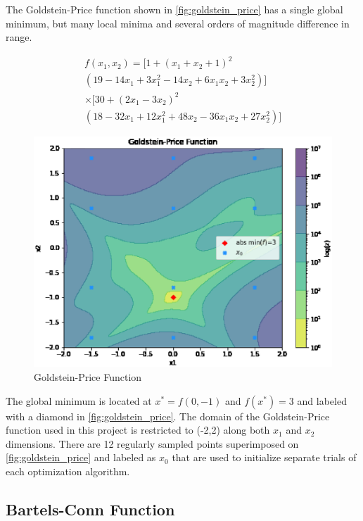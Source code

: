 \documentclass{vgtc}                          %
\begin{document}
The Goldstein-Price function \cite{Goldstein:1971} shown in \autoref{fig:goldstein_price} has a single global minimum, but many local minima and several orders of magnitude difference in range.

\begin{equation}
\begin{split}
f(x_1, x_2) = [1 + (x_1 + x_2 + 1)^2 \\
(19 - 14 x_1 + 3 x_1^2 - 14 x_2 + 6 x_1 x_2 + 3 x_2^2)] \\
\times [30 + (2 x_1 - 3 x_2)^2 \\
(18 - 32 x_1 + 12 x_1^2 + 48 x_2 - 36 x_1 x_2 + 27 x_2^2)]
\end{split}
\end{equation}

\begin{figure}[tb]
\centering
\includegraphics[width=\columnwidth]{figures/pictures/images/goldstein_price-plot2d.eps}
\caption{Goldstein-Price Function}
\label{fig:goldstein_price}
\end{figure}

 The global minimum is located at $x^* = f(0, -1)$ and $f(x^*) = 3$ and labeled with a diamond in \autoref{fig:goldstein_price}.  The domain of the Goldstein-Price function used in this project is restricted to (-2,2) along both $x_1$ and $x_2$ dimensions.  There are 12 regularly sampled points superimposed on \autoref{fig:goldstein_price} and labeled as $x_0$ that are used to initialize separate trials of each optimization algorithm.

\subsection{Bartels-Conn Function}
\end{document}
